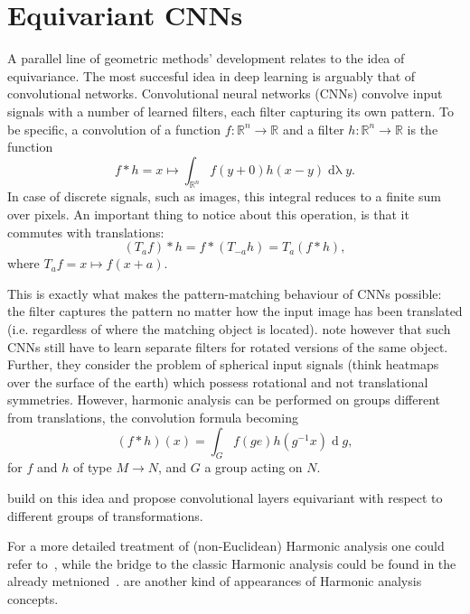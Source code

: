 \section{Equivariant CNNs} \label{sec:equivariant}

A parallel line of geometric methods' development relates to the idea of
equivariance. The most succesful idea in deep learning is arguably that of
convolutional networks. Convolutional neural networks (CNNs) convolve
input signals with a number of learned filters, each filter capturing
its own pattern. To be specific, a convolution of a function \( f: \mathbb{R}^n
\to \mathbb{R} \) and a filter \( h: \mathbb{R}^n \to \mathbb{R} \) is the
function~\cite{feichtingerFAHA}
\[ f*h = x \mapsto \int_{\mathbb{R}^n} f(y + 0) h(x-y)
\operatorname{d\lambda} y. \]
In case of discrete signals, such as images, this
integral reduces to a finite sum over pixels. An important thing to notice
about this operation, is that it commutes with translations:
\[ (T_a f) * h = f * (T_{-a} h) = T_a (f * h), \]
where \( T_a f = x \mapsto f(x + a) \).

This is exactly what makes the pattern-matching behaviour of CNNs possible: the
filter captures the pattern no matter how the input image has been translated
(i.e. regardless of where the matching object is located). \citet{s2cnn} note
however that such CNNs still have to learn separate filters for rotated
versions of the same object. Further, they consider the problem of spherical
input signals (think heatmaps over the surface of the earth) which possess
rotational and not translational symmetries. However, harmonic analysis can be
performed on groups different from translations, the convolution
formula becoming
\[
(f * h)(x) = \int_G f(g e) h(g^{-1}x) \operatorname{d}g,
\]
for \( f \) and \( h \) of type \( M\to N \), and \( G \) a group acting on
\( N \).

\citet{s2cnn,cohen2018general,e2cnn} build on this idea and propose
convolutional layers equivariant with respect to different groups of
transformations.

For a more detailed treatment of (non-Euclidean) Harmonic analysis one could
refer
to~\citet{axlerHarmonic,
elliott2019generalized,
explorationsHarmonic,
benedettoHarmonic,
stollharmonic,
terrasHarmonicSymmetric,
terrasHarmonicSymmetric2,
fourierS2},
while the bridge to the classic Harmonic analysis could be found in the already
metnioned~\cite{feichtingerFAHA}.
\citet{eyeRotations,zhou2019glosh,scnnNiessner} are another kind of appearances
of Harmonic analysis concepts.

